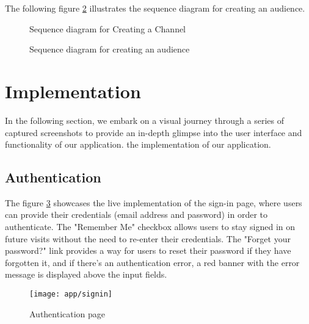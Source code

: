 \noindent The following figure \ref{seq-create-audience} illustrates the sequence diagram for creating an audience.

\begin{landscape}
    \begin{figure}[hbt!]
        \centering
        
        \caption{Sequence diagram for Creating a Channel}
        \label{seq-create-channel}
    \end{figure}
\end{landscape}

\begin{landscape}
    \begin{figure}[hbt!]
        \centering
        
        \caption{Sequence diagram for creating an audience}
        \label{seq-create-audience}
    \end{figure}
\end{landscape}


\section{Implementation}
In the following section, we embark on a visual journey through a series of captured screenshots to provide
an in-depth glimpse into the user interface and functionality of our application.
the implementation of our application.

\subsection{Authentication}
The figure \ref{ss-signin} showcases the live implementation of the sign-in page, where users can provide
their credentials (email address and password) in order to authenticate. The "Remember Me" checkbox allows
users to stay signed in on future visits without the need to re-enter their credentials. The "Forget your
password?" link provides a way for users to reset their password if they have forgotten it, and if there's
an authentication error, a red banner with the error message is displayed above the input fields. \\

\begin{figure}[hbt!]
    \centering
    \texttt{[image: app/signin]}
    \caption{Authentication page}
    \label{ss-signin}
\end{figure}


